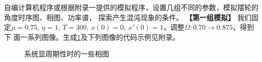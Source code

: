 \documentclass[dvipsnames, svgnames,a4paper,11pt]{article}
\begin{document}
\begin{question}
	自编计算机程序或根据附录一提供的模拟程序，设置几组不同的参数，模拟摆轮的角度时序图、相图、功率谱，
	探索产生混沌现象的条件。
	\tcblower
	\textbf{【第一组模拟】}
	我们固定$\mu = 0.75$, $\eta = 1$, $T = 300$, $x(0) = 0$, $x'(0) = 1$，调整$\Omega:0.70 \to 0.875$，得到下
	面一系列图像。生成\ref{1}及下列图像的代码示例见附录。
	\begin{figure}[H]
		\centering  %
		\label{1}
		\caption{系统显周期性时的一些相图}
	\end{figure}
	\begin{figure}[H]     
		\centering  %
			

\end{figure}
\end{question}
\end{document}
